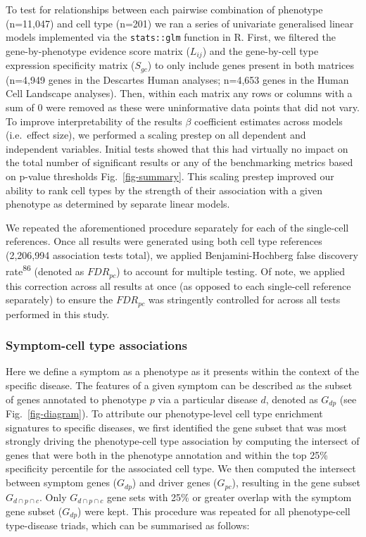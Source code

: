 \documentclass[
]{article}
\begin{document}
To test for relationships between each pairwise combination of phenotype
(n=11,047) and cell type (n=201) we ran a series of univariate
generalised linear models implemented via the \texttt{stats::glm}
function in R. First, we filtered the gene-by-phenotype evidence score
matrix (\(L_{ij}\)) and the gene-by-cell type expression specificity
matrix (\(S_{gc}\)) to only include genes present in both matrices
(n=4,949 genes in the Descartes Human analyses; n=4,653 genes in the
Human Cell Landscape analyses). Then, within each matrix any rows or
columns with a sum of 0 were removed as these were uninformative data
points that did not vary. To improve interpretability of the results
\(\beta\) coefficient estimates across models (i.e.~effect size), we
performed a scaling prestep on all dependent and independent variables.
Initial tests showed that this had virtually no impact on the total
number of significant results or any of the benchmarking metrics based
on p-value thresholds Fig.~\ref{fig-summary}. This scaling prestep
improved our ability to rank cell types by the strength of their
association with a given phenotype as determined by separate linear
models.

We repeated the aforementioned procedure separately for each of the
single-cell references. Once all results were generated using both cell
type references (2,206,994 association tests total), we applied
Benjamini-Hochberg false discovery rate\textsuperscript{86} (denoted as
\(FDR_{pc}\)) to account for multiple testing. Of note, we applied this
correction across all results at once (as opposed to each single-cell
reference separately) to ensure the \(FDR_{pc}\) was stringently
controlled for across all tests performed in this study.

\subsubsection{Symptom-cell type
associations}\label{symptom-cell-type-associations}

Here we define a symptom as a phenotype as it presents within the
context of the specific disease. The features of a given symptom can be
described as the subset of genes annotated to phenotype \(p\) via a
particular disease \(d\), denoted as \(G_{dp}\) (see
Fig.~\ref{fig-diagram}). To attribute our phenotype-level cell type
enrichment signatures to specific diseases, we first identified the gene
subset that was most strongly driving the phenotype-cell type
association by computing the intersect of genes that were both in the
phenotype annotation and within the top 25\% specificity percentile for
the associated cell type. We then computed the intersect between symptom
genes (\(G_{dp}\)) and driver genes (\(G_{pc}\)), resulting in the gene
subset \(G_{d \cap p \cap c}\). Only \(G_{d \cap p \cap c}\) gene sets
with 25\% or greater overlap with the symptom gene subset (\(G_{dp}\))
were kept. This procedure was repeated for all phenotype-cell
type-disease triads, which can be summarised as follows:
\end{document}

